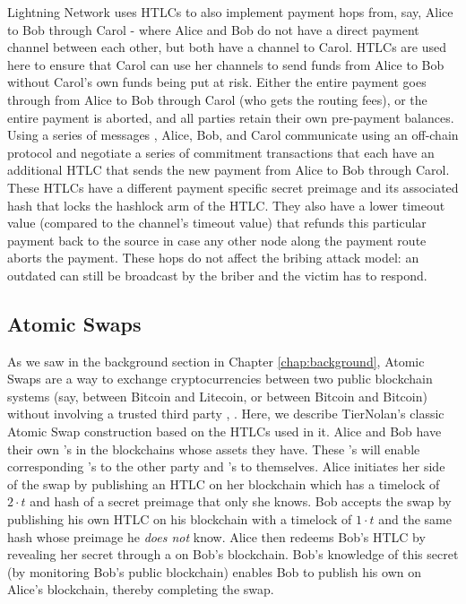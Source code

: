 Lightning Network uses HTLCs to also implement payment hops from, say, Alice to Bob through Carol - where Alice and Bob do not have a direct payment channel between each other, but both have a channel to Carol. HTLCs are used here to ensure that Carol can use her channels to send funds from Alice to Bob without Carol's own funds being put at risk. Either the entire payment goes through from Alice to Bob through Carol (who gets the routing fees), or the entire payment is aborted, and all parties retain their own pre-payment balances. Using a series of messages \cite{bolt_3}, Alice, Bob, and Carol communicate using an off-chain protocol and negotiate a series of commitment transactions that each have an additional HTLC that sends the new payment from Alice to Bob through Carol. These HTLCs have a different payment specific secret preimage and its associated hash that locks the hashlock arm of the HTLC. They also have a lower timeout value (compared to the channel's timeout value) that refunds this particular payment back to the source in case any other node along the payment route aborts the payment. These hops do not affect the bribing attack model: an outdated \ctx{} can still be broadcast by the briber and the victim has to respond.

\subsection{Atomic Swaps}
As we saw in the background section in Chapter \ref{chap:background}, Atomic Swaps are a way to exchange cryptocurrencies between two public blockchain systems (say, between Bitcoin and Litecoin, or between Bitcoin and Bitcoin) without involving a trusted third party \cite{herlihy2018atomic}, \cite{atomic_swaps_american_call_options}. Here, we describe TierNolan's classic Atomic Swap construction \cite{atomic_swap} based on the HTLCs used in it. Alice and Bob have their own \htlctxn's in the blockchains whose assets they have. These \htlctxn's will enable corresponding \sellertxn{}'s to the other party and 's to themselves. Alice initiates her side of the swap by publishing an HTLC on her blockchain which has a timelock of $2\cdot t$ and hash of a secret preimage that only she knows. Bob accepts the swap by publishing his own HTLC on his blockchain with a timelock of $1\cdot t$ and the same hash whose preimage he \emph{does not} know. Alice then redeems Bob's HTLC by revealing her secret through a \sellertxn{} on Bob's blockchain. Bob's knowledge of this secret (by monitoring Bob's public blockchain) enables Bob to publish his own \sellertxn{} on Alice's blockchain, thereby completing the swap. 

